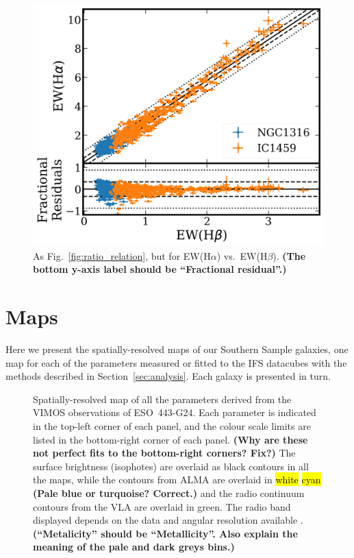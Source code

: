 \documentclass[a4paper,fleqn,usenatbib]{mnras}
\DeclareRobustCommand{\removed}[1]{{\sethlcolor{red}\hl{#1}}}
\DeclareRobustCommand{\added}[1]{{\sethlcolor{green}\hl{#1}}}
\begin{document}
\begin{figure}
  \includegraphics[width=\columnwidth]{EQw_fit.png}
  \caption[EW(H$\alpha$) vs.\ EW(H$\beta$)]{As
    Fig.~\ref{fig:ratio_relation}, but for EW(H$\alpha$) vs.\
    EW(H$\beta$). {\bf (The bottom y-axis label should be ``Fractional
      residual''.)}}
  \label{fig:EqW_relation}
\end{figure}

\section{Maps}
\label{sec:maps}

Here we present the spatially-resolved maps of our Southern Sample
galaxies, one map for each of the parameters measured or fitted to the
IFS datacubes with the methods described in
Section~\ref{sec:analysis}. Each galaxy is presented in turn.

\begin{figure}
  \centering
  \caption{Spatially-resolved map of all the parameters derived from
    the VIMOS observations of ESO~443-G24. Each parameter is indicated
    in the top-left corner of each panel, and the colour scale limits
    are listed in the bottom-right corner of each panel. {\bf (Why are
      these not perfect fits to the bottom-right corners? Fix?)} The
    surface brightness (isophotes) are overlaid as black contours in
    all the maps, while the \ce{^{12}CO(2-1)} contours from ALMA are
    overlaid in \removed{white} \added{cyan} {\bf (Pale blue or 
    turquoise? Correct.)} and the
    radio continuum contours from the VLA are overlaid in green. The
    radio band displayed depends on the data and angular resolution
    available \citep[see][]{ruffa2019a, ruffa2019b}. {\bf
      (``Metalicity'' should be ``Metallicity''. Also explain the
      meaning of the pale and dark greys bins.)}}
  \label{fig:eso443}
\end{figure}
\end{document}
